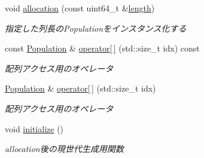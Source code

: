 \begin{DoxyCompactItemize}
void \mbox{\hyperlink{class_g_a_1_1_genetic_algorithm_a2661a7b2739663668602af7648d1e0d3}{allocation}} (const uint64\+\_\+t \&\mbox{\hyperlink{class_g_a_1_1_genetic_algorithm_ac14b87eff3d1c6efc8df49ea553f1899}{length}})
\begin{DoxyCompactList}\small\item\em 指定した列長の\+Populationをインスタンス化する \end{DoxyCompactList}\item 
\mbox{\label{class_g_a_1_1_genetic_algorithm_a5b4ea58a3fa0c360b1c7ae8f00f4c3aa}} 
const \mbox{\hyperlink{class_g_a_1_1_population}{Population}} \& \mbox{\hyperlink{class_g_a_1_1_genetic_algorithm_a5b4ea58a3fa0c360b1c7ae8f00f4c3aa}{operator\mbox{[}$\,$\mbox{]}}} (std\+::size\+\_\+t idx) const
\begin{DoxyCompactList}\small\item\em 配列アクセス用のオペレータ \end{DoxyCompactList}\item 
\mbox{\label{class_g_a_1_1_genetic_algorithm_af896a9c7d10d430d42e082eb3e6abea5}} 
\mbox{\hyperlink{class_g_a_1_1_population}{Population}} \& \mbox{\hyperlink{class_g_a_1_1_genetic_algorithm_af896a9c7d10d430d42e082eb3e6abea5}{operator\mbox{[}$\,$\mbox{]}}} (std\+::size\+\_\+t idx)
\begin{DoxyCompactList}\small\item\em 配列アクセス用のオペレータ \end{DoxyCompactList}\item 
\mbox{\label{class_g_a_1_1_genetic_algorithm_ae0529e9d547c16f0c4e668a1de882632}} 
void \mbox{\hyperlink{class_g_a_1_1_genetic_algorithm_ae0529e9d547c16f0c4e668a1de882632}{initialize}} ()
\begin{DoxyCompactList}\small\item\em allocation後の現世代生成用関数 \end{DoxyCompactList}\end{DoxyCompactItemize}

